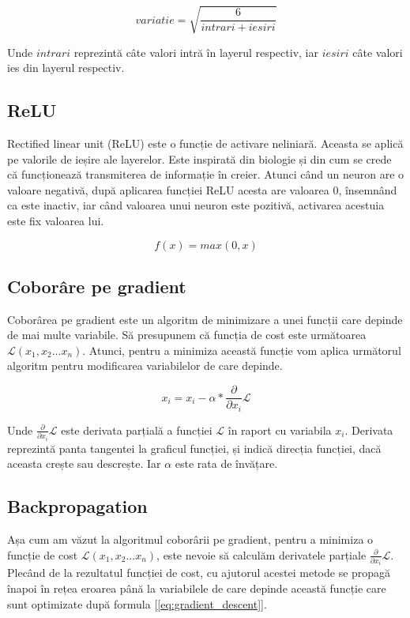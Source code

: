 \begin{equation}
\label{eq:xavier}
variatie = \sqrt{\frac{6}{intrari + iesiri}}
\end{equation}

Unde $intrari$ reprezintă câte valori intră în layerul respectiv, iar $iesiri$ câte valori ies din layerul respectiv.

\subsection{ReLU}
\label{sb:relu}
Rectified linear unit (ReLU) \cite{wiki_relu} este o funcție de activare neliniară. Aceasta se aplică pe valorile de ieșire ale layerelor. Este inspirată din biologie și din cum se crede că funcționează transmiterea de informație în creier. Atunci când un neuron are o valoare negativă, după aplicarea funcției ReLU acesta are valoarea 0, însemnând ca este inactiv, iar când valoarea unui neuron este pozitivă, activarea acestuia este fix valoarea lui.

\begin{equation}
\label{eq:relu}
f(x) = max(0, x)
\end{equation}

\subsection{Coborâre pe gradient}
\label{sb:gradient_descent}
Coborârea pe gradient \cite{coursera_deep_learning} este un algoritm de minimizare a unei funcții care depinde de mai multe variabile. Să presupunem că funcția de cost este următoarea $\mathcal{L}(x_1, x_2 ... x_n)$. Atunci, pentru a minimiza această funcție vom aplica următorul algoritm pentru modificarea variabilelor de care depinde.

\begin{equation}
\label{eq:gradient_descent}
x_i = x_i - \alpha * \frac{\partial}{\partial{x_i}}\mathcal{L}
\end{equation}

Unde $\frac{\partial}{\partial{x_i}}\mathcal{L}$ este derivata parțială a funcției $\mathcal{L}$ în raport cu variabila $x_i$. Derivata reprezintă panta tangentei la graficul funcției, și indică direcția funcției, dacă aceasta crește sau descrește. Iar $\alpha$ este rata de învățare.

\subsection{Backpropagation}
\label{sb:backpropagation}
\cite{coursera_deep_learning} Așa cum am văzut la algoritmul coborârii pe gradient, pentru a minimiza o funcție de cost $\mathcal{L}(x_1, x_2 ... x_n)$, este nevoie să calculăm derivatele parțiale $\frac{\partial}{\partial{x_i}}\mathcal{L}$. Plecând de la rezultatul funcției de cost, cu ajutorul acestei metode se propagă înapoi în rețea eroarea până la variabilele de care depinde această funcție care sunt optimizate după formula [\ref{eq:gradient_descent}].

